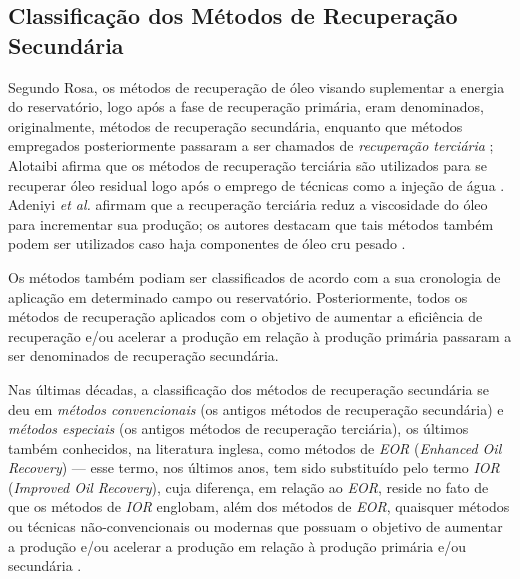\subsection{Classifica\c{c}\~{a}o dos M\'{e}todos de Recupera\c{c}\~{a}o Secund\'{a}ria}
Segundo Rosa, os m\'{e}todos de recupera\c{c}\~{a}o de \'{o}leo visando suplementar a energia do reservat\'{o}rio, logo ap\'{o}s a fase de recupera\c{c}\~{a}o prim\'{a}ria, eram denominados, originalmente, m\'{e}todos de recupera\c{c}\~{a}o secund\'{a}ria, enquanto que m\'{e}todos empregados posteriormente passaram a ser chamados de \textit{recupera\c{c}\~{a}o terci\'{a}ria} \cite{engres}; Alotaibi afirma que os m\'{e}todos de recupera\c{c}\~{a}o terci\'{a}ria s\~{a}o utilizados para se recuperar \'{o}leo residual logo ap\'{o}s o emprego de t\'{e}cnicas como a inje\c{c}\~{a}o de \'{a}gua \cite{alotaibi}. Adeniyi \textit{et al.} afirmam que a recupera\c{c}\~{a}o terci\'{a}ria reduz a viscosidade do \'{o}leo para incrementar sua produ\c{c}\~{a}o; os autores destacam que tais m\'{e}todos tamb\'{e}m podem ser utilizados caso haja componentes de \'{o}leo cru pesado \cite{adeniyi2008}. 

Os m\'{e}todos tamb\'{e}m podiam ser classificados de acordo com a sua cronologia de aplica\c{c}\~{a}o em determinado campo ou reservat\'{o}rio. Posteriormente, todos os m\'{e}todos de recupera\c{c}\~{a}o aplicados com o objetivo de aumentar a efici\^{e}ncia de recupera\c{c}\~{a}o e/ou acelerar a produ\c{c}\~{a}o em rela\c{c}\~{a}o \`{a} produ\c{c}\~{a}o prim\'{a}ria passaram a ser denominados de recupera\c{c}\~{a}o secund\'{a}ria.

Nas \'{u}ltimas d\'{e}cadas, a classifica\c{c}\~{a}o dos m\'{e}todos de recupera\c{c}\~{a}o secund\'{a}ria se deu em \textit{m\'{e}todos convencionais} (os antigos m\'{e}todos de recupera\c{c}\~{a}o secund\'{a}ria) e \textit{m\'{e}todos especiais} (os antigos m\'{e}todos de recupera\c{c}\~{a}o terci\'{a}ria), os \'{u}ltimos tamb\'{e}m conhecidos, na literatura inglesa, como m\'{e}todos de \textit{EOR} (\textit{Enhanced Oil Recovery}) --- esse termo, nos \'{u}ltimos anos, tem sido substitu\'{i}do pelo termo \textit{IOR} (\textit{Improved Oil Recovery}), cuja diferen\c{c}a, em rela\c{c}\~{a}o ao \textit{EOR}, reside no fato de que os m\'{e}todos de \textit{IOR} englobam, al\'{e}m dos m\'{e}todos de \textit{EOR}, quaisquer m\'{e}todos ou t\'{e}cnicas n\~{a}o-convencionais ou modernas que possuam o objetivo de aumentar a produ\c{c}\~{a}o e/ou acelerar a produ\c{c}\~{a}o em rela\c{c}\~{a}o \`{a} produ\c{c}\~{a}o prim\'{a}ria e/ou secund\'{a}ria \cite[p. 564]{engres}. 

